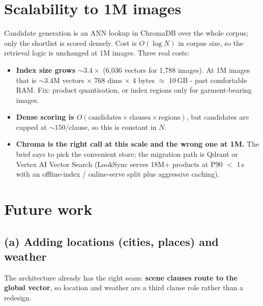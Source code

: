 \documentclass[10pt,a4paper]{article}
\begin{document}
\section{Scalability to 1M images}

Candidate generation is an ANN lookup in ChromaDB over the whole corpus; only the
shortlist is scored densely. Cost is $O(\log N)$ in corpus size, so the retrieval logic
is unchanged at 1M images. Three real costs:

\begin{itemize}
  \item \textbf{Index size grows ${\sim}3.4\times$} (6{,}036 vectors for 1{,}788 images).
        At 1M images that is ${\sim}3.4$M vectors $\times$ 768 dims $\times$ 4 bytes
        $\approx$ 10\,GB - past comfortable RAM. Fix: product quantisation, or index
        regions only for garment-bearing images.
  \item \textbf{Dense scoring is $O(\text{candidates} \times \text{clauses} \times
        \text{regions})$}, but candidates are capped at ${\sim}150$/clause, so this is
        constant in $N$.
  \item \textbf{Chroma is the right call at this scale and the wrong one at 1M.} The
        brief says to pick the convenient store; the migration path is Qdrant or Vertex
        AI Vector Search (LookSync serves 18M+ products at P90 $<$ 1\,s with an
        offline-index / online-serve split plus aggressive caching).
\end{itemize}

\section{Future work}

\subsection{(a) Adding locations (cities, places) and weather}

The architecture already has the right seam: \textbf{scene clauses route to the global
vector}, so location and weather are a third clause role rather than a redesign.
\end{document}
